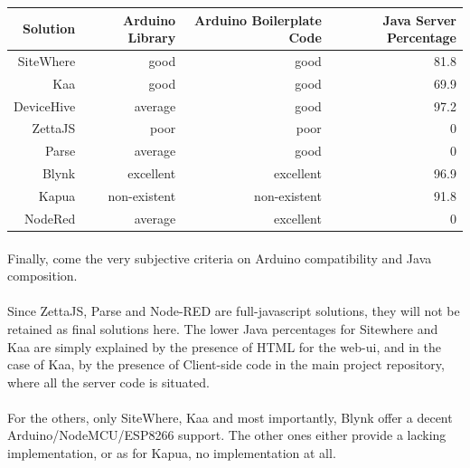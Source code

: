 \documentclass{article}
\begin{document}
\begin{center}
\begin{tabular}{r|r|r|r}
Solution & Arduino Library & Arduino Boilerplate Code & Java Server Percentage \\ \hline
SiteWhere & \cellcolor{blue!10}good & \cellcolor{blue!10}good & \cellcolor{green!25}81.8 \\
Kaa & \cellcolor{blue!10}good & \cellcolor{blue!10}good & \cellcolor{green!25}69.9 \\
DeviceHive & \cellcolor{yellow!25}average & \cellcolor{blue!10}good & \cellcolor{green!25}97.2 \\
ZettaJS & \cellcolor{orange!25}poor & \cellcolor{orange!25}poor & \cellcolor{red!25}0 \\
Parse & \cellcolor{yellow!25}average & \cellcolor{blue!10}good & \cellcolor{red!25}0 \\
Blynk & \cellcolor{green!25}excellent & \cellcolor{green!25}excellent & \cellcolor{green!25}96.9 \\
Kapua & \cellcolor{red!25}non-existent & \cellcolor{red!25}non-existent & \cellcolor{green!25}91.8 \\
NodeRed & \cellcolor{yellow!25}average & \cellcolor{green!25}excellent & \cellcolor{red!25}0 \\
\end{tabular}
\end{center}

\paragraph{} Finally, come the very subjective criteria on Arduino compatibility and Java composition.

\paragraph{} Since ZettaJS, Parse and Node-RED are full-javascript solutions, they will not be retained as final solutions here. The lower Java percentages for Sitewhere and Kaa are simply explained by the presence of HTML for the web-ui, and in the case of Kaa, by the presence of Client-side code in the main project repository, where all the server code is situated.

\paragraph{} For the others, only SiteWhere, Kaa and most importantly, Blynk offer a decent Arduino/NodeMCU/ESP8266 support. The other ones either provide a lacking implementation, or as for Kapua, no implementation at all.
\end{document}
